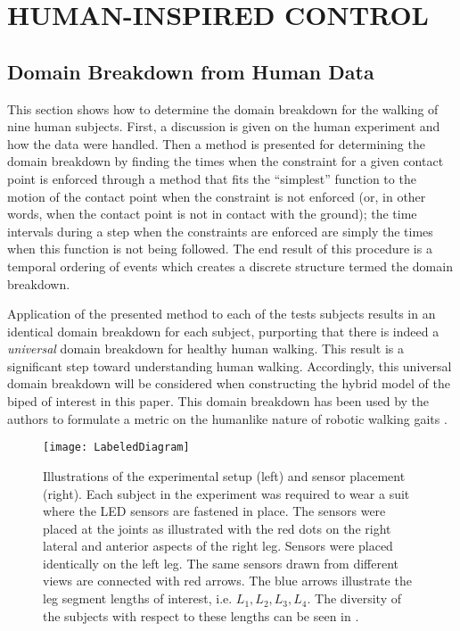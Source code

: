 \chapter{\uppercase{Human-Inspired Control}} \label{ch:hic}

\section{Domain Breakdown from Human Data} \label{sec:domainbreakdown} \noindent
This section shows how to determine the domain breakdown for the walking of nine
human subjects.  First, a discussion is given on the human experiment and how
the data were handled. Then a method is presented for determining the domain
breakdown by finding the times when the constraint for a given contact point is
enforced through a method that fits the ``simplest'' function to the motion of
the contact point when the constraint is not enforced (or, in other words, when
the contact point is not in contact with the ground); the time intervals during
a step when the constraints are enforced are simply the times when this function
is not being followed. The end result of this procedure is a temporal ordering
of events which creates a discrete structure termed the domain breakdown.

Application of the presented method to each of the tests subjects results in an
identical domain breakdown for each subject, purporting that there is indeed a
{\em universal} domain breakdown for healthy human walking. This result is a
significant step toward understanding human walking. Accordingly, this universal
domain breakdown will be considered when constructing the hybrid model of the
biped of interest in this paper. This domain breakdown has been used by the
authors to formulate a metric on the humanlike nature of robotic walking gaits \cite{Ames2011,Vasudevan2013}.

\begin{figure}[t!]
  \centering
  \texttt{[image: LabeledDiagram]}
  \caption{Illustrations of the experimental setup (left) and sensor placement (right). Each subject in the experiment was required to wear a suit where the LED sensors are fastened in place. The sensors were placed at the joints as illustrated with the red dots on the right lateral and anterior aspects of the right leg. Sensors were placed identically on the left leg. The same sensors drawn from different views are connected with red arrows. The blue arrows illustrate the leg segment lengths of interest, i.e. $L_1, L_2, L_3, L_4$. The diversity of the subjects with respect to these lengths can be seen in .}
  \label{fig:Sensors}
\end{figure}

